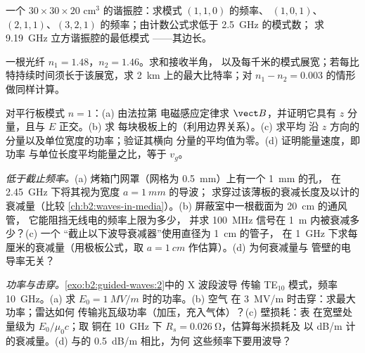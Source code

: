 \begin{exercise}[$\star$]\label{exo:b2:guided-waves:3}
一个 $30 \times 30 \times 20$ cm$^3$ 的谐振腔：求模式 $(1,1,0)$ 的频率、
$(1,0,1)$、$(2,1,1)$、$(3,2,1)$ 的频率；由计数公式求低于 \qty{2.5}{GHz} 的模式数；
求 \qty{9.19}{GHz} 立方谐振腔的最低模式
——其边长。
\end{exercise}

\begin{exercise}[$\star$]\label{exo:b2:guided-waves:4}
一根光纤 $n_1 = 1.48$，$n_2 = 1.46$。求和接收半角，
以及每千米的模式展宽；若每比特持续时间须长于该展宽，求
\qty{2}{km} 上的最大比特率；对
$n_1 - n_2 = 0.003$ 的情形做同样计算。
\end{exercise}

\begin{exercise}[$\star\star$]\label{exo:b2:guided-waves:5}
对平行板模式 $n = 1$：(a) 由法拉第
电磁感应定律求 $\vect B$，并证明它具有 $z$ 分量，且与 $E$ 正交。(b) 求
每块极板上的（利用边界关系）。(c) 求平均
沿 $z$ 方向的分量以及单位宽度的功率；验证其横向
分量的平均值为零。(d) 证明能量速度，即功率
与单位长度平均能量之比，等于 $v_g$。
\end{exercise}

\begin{exercise}[$\star\star$]\label{exo:b2:guided-waves:6}
\emph{低于截止频率。}(a) 烤箱门网罩（网格为 \qty{0.5}{mm}）上有一个 \qty{1}{mm} 的孔，
在 \qty{2.45}{GHz} 下将其视为宽度 $a = \qty{1}{mm}$ 的导波；
求穿过该薄板的衰减长度及以计的衰减量（比较
\cref{ch:b2:waves-in-media}）。(b) 屏蔽室中一根截面为 \qty{20}{cm} 的通风管，
它能阻挡无线电的频率上限为多少，
并求 \qty{100}{MHz} 信号在 \qty{1}{m} 内被衰减多少？(c) 一个
“截止以下波导衰减器”使用直径为 \qty{1}{cm} 的管子，
在 \qty{1}{GHz} 下求每厘米的衰减量（用极板公式，取 $a =
\qty{1}{cm}$ 作估算）。(d) 为何衰减量与
管壁的电导率无关？
\end{exercise}

\begin{exercise}[$\star\star$]\label{exo:b2:guided-waves:7}
\emph{功率与击穿。}\cref{exo:b2:guided-waves:2}中的 X 波段波导
传输 TE$_{10}$ 模式，频率 \qty{10}{GHz}。(a) 求 $E_0 = \qty{1}{MV/m}$ 时的功率。(b) 空气
在 \qty{3}{MV/m} 时击穿：求最大功率；雷达如何
传输兆瓦级功率（加压，充入气体）？(c) 壁损耗：表
在宽壁处量级为 $E_0/\mu_0c$；取
铜在 \qty{10}{GHz} 下 $R_s = \qty{0.026}{\ohm}$，估算每米损耗及
以 dB/m 计的衰减量。(d) 与的 \qty{0.5}{dB/m} 相比，为何
这些频率下要用波导？
\end{exercise}

